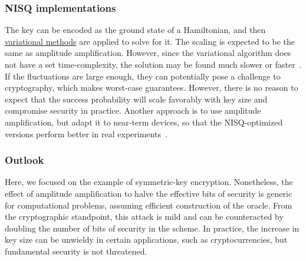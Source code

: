 \begin{refsection}
\subsubsection*{NISQ implementations}

The key can be encoded as the ground state of a Hamiltonian, and then \hyperref[prim:VQA]{variational methods} are applied to solve for it. The scaling is expected to be the same as amplitude amplification. However, since the variational algorithm does not have a set time-complexity, the solution may be found much slower or faster~\cite{wang2022VariationalSymmetricAttack}. If the fluctuations are large enough, they can potentially pose a challenge to cryptography, which makes worst-case guarantees. However, there is no reason to expect that the success probability will scale favorably with key size and compromise security in practice. Another approach is to use amplitude amplification, but adapt it to near-term devices, so that the NISQ-optimized versions perform better in real experiments~\cite{zhang2022NISQSearch}.

\subsubsection*{Outlook}
Here, we focused on the example of symmetric-key encryption. Nonetheless, the effect of amplitude amplification to halve the effective bits of security is generic for computational problems, assuming efficient construction of the oracle. From the cryptographic standpoint, this attack is mild and can be counteracted by doubling the number of bits of security in the scheme. In practice, the increase in key size can be unwieldy in certain applications, such as cryptocurrencies, but fundamental security is not threatened.

\printbibliography[heading=secbib,segment=\therefsegment]
\end{refsection}
